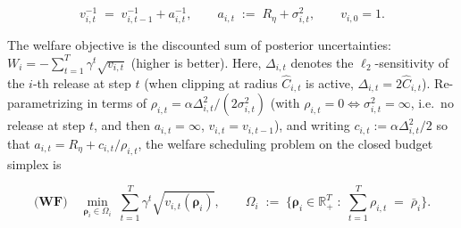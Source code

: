 \documentclass{article}
\begin{document}
\begin{equation}
v_{i,t}^{-1} \;=\; v_{i,t-1}^{-1} + a_{i,t}^{-1}, \qquad a_{i,t} \;:=\; R_\eta + \sigma_{i,t}^2, \qquad v_{i,0} = 1.
\end{equation}

The welfare objective is the discounted sum of posterior uncertainties: $W_i = -\sum_{t=1}^T \gamma^t \sqrt{v_{i,t}}$ (higher is better). Here, $\Delta_{i,t}$ denotes the $\ell_2$-sensitivity of the $i$-th release at step $t$ (when clipping at radius $\hat C_{i,t}$ is active, $\Delta_{i,t} = 2\hat C_{i,t}$). Re-parametrizing in terms of $\rho_{i,t} = \alpha \Delta_{i,t}^2/(2\sigma_{i,t}^2)$ (with $\rho_{i,t} = 0 \Leftrightarrow \sigma_{i,t}^2 = \infty$, i.e.\ no release at step $t$, and then $a_{i,t} = \infty$, $v_{i,t} = v_{i,t-1}$), and writing $c_{i,t} := \alpha\Delta_{i,t}^2/2$ so that $a_{i,t} = R_\eta + c_{i,t}/\rho_{i,t}$, the welfare scheduling problem on the closed budget simplex is

\begin{equation}
    \textbf{(WF)} \quad \min_{\boldsymbol{\rho}_i \in \Omega_i} \;\sum_{t=1}^T \gamma^t \sqrt{v_{i,t}(\boldsymbol{\rho}_i)}, \qquad \Omega_i \;:=\; \Big\{\boldsymbol{\rho}_i \in \mathbb{R}_+^T \;:\; \textstyle\sum_{t=1}^T \rho_{i,t} \;=\; \bar\rho_i\Big\}.
\end{equation}
\end{document}
